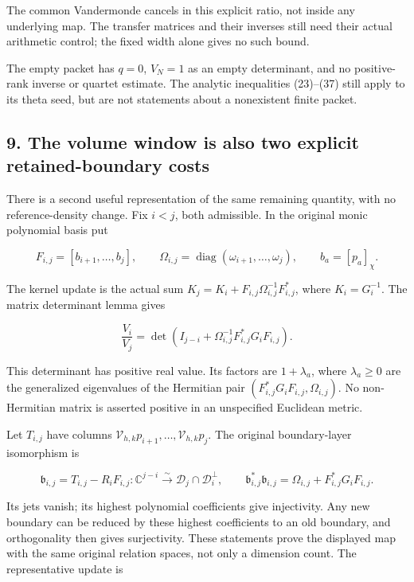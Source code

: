 \documentclass[11pt,a4paper]{article}
\begin{document}
The common Vandermonde cancels in this explicit ratio, not inside any underlying map. The transfer matrices and their inverses still need their actual arithmetic control; the fixed width alone gives no such bound.

The empty packet has \(q=0\), \(V_N=1\) as an empty determinant, and no positive-rank inverse or quartet estimate. The analytic inequalities (23)--(37) still apply to its theta seed, but are not statements about a nonexistent finite packet.

\subsection{9. The volume window is also two explicit retained-boundary costs}\label{zlm:endpoint-arithmetic_original--the-volume-window-is-also-two-explicit-retained-boundary-costs}

There is a second useful representation of the same remaining quantity, with no reference-density change. Fix \(i<j\), both admissible. In the original monic polynomial basis put

\[
 F_{i,j}=[b_{i+1},\ldots,b_j],\qquad
 \Omega_{i,j}=\operatorname{diag}(\omega_{i+1},\ldots,\omega_j),
 \qquad b_a=[p_a]_\chi.                                                 \tag{43}
\]

The kernel update is the actual sum \(K_j=K_i+F_{i,j}\Omega_{i,j}^{-1}F_{i,j}^*\), where \(K_i=G_i^{-1}\). The matrix determinant lemma gives

\[
 \boxed{\frac{V_i}{V_j}
 =\det\!\left(I_{j-i}+\Omega_{i,j}^{-1}F_{i,j}^*G_iF_{i,j}\right).}       \tag{44}
\]

This determinant has positive real value. Its factors are \(1+\lambda_a\), where \(\lambda_a\ge0\) are the generalized eigenvalues of the Hermitian pair \((F_{i,j}^*G_iF_{i,j},\Omega_{i,j})\). No non-Hermitian matrix is asserted positive in an unspecified Euclidean metric.

Let \(T_{i,j}\) have columns \(\mathcal V_{h,k}p_{i+1},\ldots,
\mathcal V_{h,k}p_j\). The original boundary-layer isomorphism is

\[
 \mathfrak b_{i,j}=T_{i,j}-R_iF_{i,j}:
 \mathbb C^{j-i}\xrightarrow{\sim}
 \mathcal D_j\cap\mathcal D_i^\perp,
 \qquad
 \mathfrak b_{i,j}^*\mathfrak b_{i,j}
 =\Omega_{i,j}+F_{i,j}^*G_iF_{i,j}.                                     \tag{45}
\]

Its jets vanish; its highest polynomial coefficients give injectivity. Any new boundary can be reduced by these highest coefficients to an old boundary, and orthogonality then gives surjectivity. These statements prove the displayed map with the same original relation spaces, not only a dimension count. The representative update is
\end{document}
